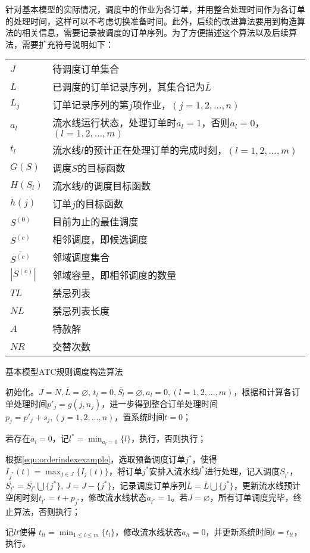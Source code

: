 针对基本模型的实际情况，调度中的作业为各订单，并用整合处理时间作为各订单的处理时间，这样可以不考虑切换准备时间。此外，后续的改进算法要用到构造算法的相关信息，需要记录被调度的订单序列。为了方便描述这个算法以及后续算法，需要扩充符号说明如下：

\begin{tabular}{ll}
$J$ & 待调度订单集合\\
$L$ & 已调度的订单记录序列，其集合记为$\overline{L}$\\
$L_j$ & 订单记录序列的第$j$项作业，$(j = 1,2,...,n)$\\
$a_l$ & 流水线运行状态，处理订单时$a_l = 1$，否则$a_l = 0$，$(l = 1,2,...,m)$\\
$t_l$ & 流水线$l$的预计正在处理订单的完成时刻，$(l = 1,2,...,m)$\\
$G(S)$& 调度$S$的目标函数\\
$H(S_l)$ & 流水线$l$的调度目标函数\\
$h(j)$ & 订单$j$的目标函数\\
$S^{(0)}$ & 目前为止的最佳调度\\
$S^{(c)}$& 相邻调度，即候选调度\\
$\overline{S^{(c)}}$& 邻域调度集合\\
$|S^{(c)}|$& 邻域容量，即相邻调度的数量\\
$TL$ & 禁忌列表\\
$NL$ &禁忌列表长度\\
$A$ & 特赦解\\
$NR$ &交替次数
\end{tabular}

\begin{algori}
基本模型ATC规则调度构造算法\label{alg:basicconstruct}

\begin{asparaenum}
\renewcommand{\labelenumi}{\bf Step\theenumi~}
\item 初始化。$J = N, \overline{L} = \varnothing$, $t_l = 0, \overline{S_l} = \varnothing, a_l=0, (l = 1,2,...,m)$，根据和计算各订单处理时间$p'_j = g(j, n_j)$，进一步得到整合订单处理时间$p_j = p'_j + s_j, (j = 1,2,...,n)$，置系统时间$t = 0$；
\item 若存在$a_l = 0$，记$l^* = \displaystyle\min_{a_l = 0}\{l\}$，执行，否则执行；
\item 根据\eqref{equ:orderindexexample}，选取预备调度订单$j^*$，使得$I_{j^*}(t) = \displaystyle\max_{j\in J}\{I_j(t)\}$，将订单$j^*$安排入流水线$l^*$进行处理，记入调度$S_{l^*}$，$\overline{S_{l^*}}=\overline{S_{l^*}}\bigcup \{j^*\}$, $J = J -\{j^*\}$，记录调度订单序列$\overline{L} = \overline{L} \bigcup \{j^*\}$，更新流水线预计空闲时刻$t_{l^*} = t + p_{j^*}$，修改流水线状态$a_{l^*} = 1$。若$J = \varnothing$，所有订单调度完毕，终止算法，否则执行；
\item 记$lt$使得 $t_{lt} = \displaystyle\min_{1\le l\le m}\{t_l\}$，修改流水线状态$a_{lt} = 0$，并更新系统时间$t = t_{lt}$，执行。
\end{asparaenum}
\end{algori}

